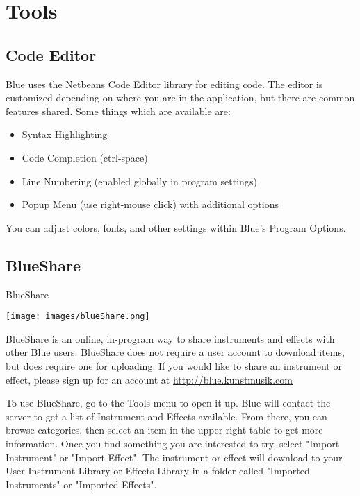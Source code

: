 \section{Tools}\label{tools}

\subsection{Code Editor}\label{codeEditor}

Blue uses the Netbeans Code Editor library for editing code. The editor
is customized depending on where you are in the application, but there
are common features shared. Some things which are available are:

\begin{itemize}
\item
  Syntax Highlighting
\item
  Code Completion (ctrl-space)
\item
  Line Numbering (enabled globally in program settings)
\item
  Popup Menu (use right-mouse click) with additional options
\end{itemize}

You can adjust colors, fonts, and other settings within Blue's Program
Options.

\subsection{BlueShare}\label{blueShare}

BlueShare

\texttt{[image: images/blueShare.png]}

BlueShare is an online, in-program way to share instruments and effects
with other Blue users. BlueShare does not require a user account to
download items, but does require one for uploading. If you would like to
share an instrument or effect, please sign up for an account at
\url{http://blue.kunstmusik.com}

To use BlueShare, go to the Tools menu to open it up. Blue will contact
the server to get a list of Instrument and Effects available. From
there, you can browse categories, then select an item in the upper-right
table to get more information. Once you find something you are
interested to try, select "Import Instrument" or "Import Effect". The
instrument or effect will download to your User Instrument Library or
Effects Library in a folder called "Imported Instruments" or "Imported
Effects".

